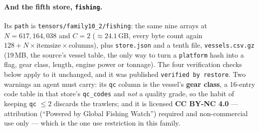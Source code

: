 \documentclass[10pt]{article}
\newcommand{\code}[1]{\texttt{#1}}
\begin{document}
\paragraph{And the fifth store, \code{fishing}.} Its \code{path} is
\code{tensors/family10\_2/fishing}: the same nine arrays at $N =
617{,}164{,}038$ and $C = 2$ ($\approx 24.1$\,GB, every byte count again
$128 + N \times \text{itemsize} \times \text{columns}$), plus
\code{store.json} and a tenth file, \code{vessels.csv.gz} (19\,MB, the source's
vessel table, the only way to turn a \code{platform} hash into a flag, gear
class, length, engine power or tonnage). The four verification checks below
apply to it unchanged, and it was published \code{verified by restore}. Two
warnings an agent must carry: its \code{qc} column is the vessel's
\textbf{gear class}, a 16-entry code table in that store's \code{qc\_codes} and
\emph{not} a quality grade, so the habit of keeping \code{qc} $\le 2$ discards
the trawlers; and it is licensed \textbf{CC BY-NC 4.0} --- attribution
(``Powered by Global Fishing Watch'') required and non-commercial use only ---
which is the one use restriction in this family.
\end{document}
